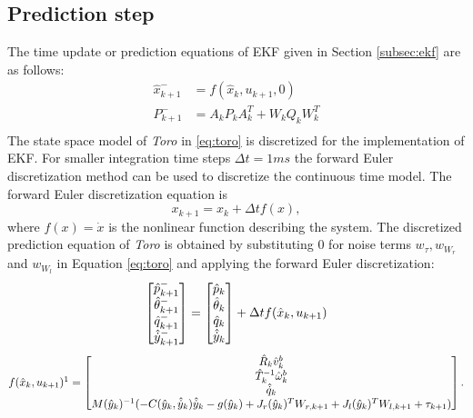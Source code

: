 \subsection{Prediction step}
\label{subsec:toro_predict}
The time update or prediction equations of EKF given in Section \ref{subsec:ekf}  are as follows:
\begin{equation}
\label{eq:predict}
\begin{split}
\hat{x}_{k+1}^- &= f(\hat{x}_{k},u_{k+1},0)\\
P_{k+1}^- &= A_kP_{k}A_k^T + W_kQ_{k}W_k^T \\
\end{split}
\end{equation}
The state space model of \emph{Toro} in \ref{eq:toro} is discretized for the implementation of EKF. For smaller integration time steps $\Delta t = 1ms$ the forward Euler discretization method can be used to discretize the continuous time model. The forward Euler discretization equation is $$ x_{k+1} = x_k + \Delta t f(x),$$ where $f(x)=\dot x$ is the nonlinear function describing the system. The discretized prediction equation of \emph{Toro} is obtained by substituting $0$ for noise terms $w_\tau, w_{W_r}$ and $w_{W_l}$ in Equation \ref{eq:toro} and applying the forward Euler discretization:
\begin{equation}
\label{eq:toro_dis}
	\begin{bmatrix}
	\hat{p}_{k+1}^- \\ \hat{\theta}_{k+1}^- \\ \hat{q}_{k+1}^- \\ \hat{\dot{y}}_{k+1}^-
	\end{bmatrix}
	 =   
	 \begin{bmatrix}
	 \hat{p}_k \\ \hat{\theta}_k \\ \hat{q}_k \\ \hat{\dot{y}}_{k}
	\end{bmatrix}	  
	+ \Delta t f(\hat{x}_k,u_{k+1}) \\
\end{equation}
$$ f(\hat{x}_k,u_{k+1})\footnotemark[1] = 
	\begin{bmatrix}
	\hat R_k \hat v^b_k \\
	\hat T_k^{-1} \hat \omega_k^b  \\
	\hat{\dot{q}}_k\\
	M(\hat{y}_{k})^{-1}(-C(\hat{y}_{k},\hat{\dot{y}}_{k})\hat{\dot{y}}_{k} -g(\hat{y}_{k}) +  J_r(\hat{y}_{k})^{T}W_{r,k+1} +J_l(\hat{y}_{k})^{T}W_{l,k+1} + \tau_{k+1})	
	\end{bmatrix}. $$

